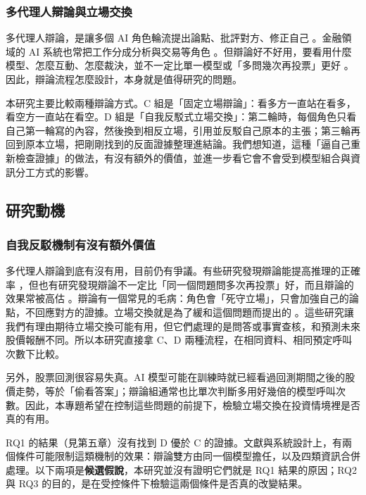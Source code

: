 \documentclass[12pt,a4paper]{article}
\numberwithin{table}{section}
\numberwithin{figure}{section}
\begin{document}
\subsubsection{多代理人辯論與立場交換}
多代理人辯論，是讓多個 AI 角色輪流提出論點、批評對方、修正自己 \citep{du2023debate,liang2023divergent}。金融領域的 AI 系統也常把工作分成分析與交易等角色 \citep{xiao2024tradingagents,zhang2024stockagent}。但辯論好不好用，要看用什麼模型、怎麼互動、怎麼裁決，並不一定比單一模型或「多問幾次再投票」更好 \citep{smit2023mad,zhang2025stop}。因此，辯論流程怎麼設計，本身就是值得研究的問題。

本研究主要比較兩種辯論方式。C 組是「固定立場辯論」：看多方一直站在看多，看空方一直站在看空。D 組是「自我反駁式立場交換」：第二輪時，每個角色只看自己第一輪寫的內容，然後換到相反立場，引用並反駁自己原本的主張；第三輪再回到原本立場，把剛剛找到的反面證據整理進結論。我們想知道，這種「逼自己重新檢查證據」的做法，有沒有額外的價值，並進一步看它會不會受到模型組合與資訊分工方式的影響。

\subsection{研究動機}

\subsubsection{自我反駁機制有沒有額外價值}
多代理人辯論到底有沒有用，目前仍有爭議。有些研究發現辯論能提高推理的正確率 \citep{du2023debate}，但也有研究發現辯論不一定比「同一個問題問多次再投票」好，而且辯論的效果常被高估 \citep{smit2023mad,zhang2025stop}。辯論有一個常見的毛病：角色會「死守立場」，只會加強自己的論點，不回應對方的證據。立場交換就是為了緩和這個問題而提出的 \citep{liu2025roleswitch,chowdhury2026proclaim}。這些研究讓我們有理由期待立場交換可能有用，但它們處理的是問答或事實查核，和預測未來股價報酬不同。所以本研究直接拿 C、D 兩種流程，在相同資料、相同預定呼叫次數下比較。

另外，股票回測很容易失真。AI 模型可能在訓練時就已經看過回測期間之後的股價走勢，等於「偷看答案」\citep{glasserman2023lookahead,kong2026bias}；辯論組通常也比單次判斷多用好幾倍的模型呼叫次數。因此，本專題希望在控制這些問題的前提下，檢驗立場交換在投資情境裡是否真的有用。

RQ1 的結果（見第五章）沒有找到 D 優於 C 的證據。文獻與系統設計上，有兩個條件可能限制這類機制的效果：辯論雙方由同一個模型擔任，以及四類資訊合併處理。以下兩項是\textbf{候選假說}，本研究並沒有證明它們就是 RQ1 結果的原因；RQ2 與 RQ3 的目的，是在受控條件下檢驗這兩個條件是否真的改變結果。
\end{document}
